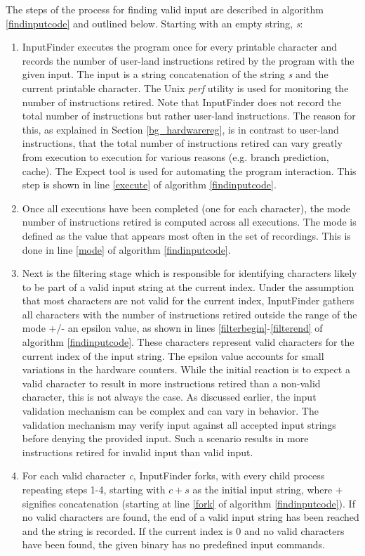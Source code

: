 \documentclass{sig-alternate-05-2015}
\def \tool {InputFinder}
\begin{document}
The steps of the process for finding valid input are described in algorithm \ref{findinputcode} and outlined below. Starting with an empty string, \textit{s}:
\begin{enumerate}
\item \tool{} executes the program once for every printable character and records the number of user-land instructions retired by the program with the given input. The input is a string concatenation of the string \textit{s} and the current printable character. The Unix \textit{perf} utility is used for monitoring the number of instructions retired. Note that \tool{} does not record the total number of instructions but rather user-land instructions. The reason for this, as explained in Section \ref{bg_hardwarereg}, is in contrast to user-land instructions, that the total number of instructions retired can vary greatly from execution to execution for various reasons (e.g. branch prediction, cache). The Expect tool is used for automating the program interaction. This step is shown in line \ref{execute} of algorithm \ref{findinputcode}.
\item Once all executions have been completed (one for each character), the mode number of instructions retired is computed across all executions. The mode is defined as the value that appears most often in the set of recordings. This is done in line \ref{mode} of algorithm \ref{findinputcode}.
\item Next is the filtering stage which is responsible for identifying characters likely to be part of a valid input string at the current index. Under the assumption that most characters are not valid for the current index, \tool{} gathers all characters with the number of instructions retired outside the range of the mode +/- an epsilon value, as shown in lines \ref{filterbegin}-\ref{filterend} of algorithm \ref{findinputcode}. These characters represent valid characters for the current index of the input string. The epsilon value accounts for small variations in the hardware counters. While the initial reaction is to expect a valid character to result in more instructions retired than a non-valid character, this is not always the case. As discussed earlier, the input validation mechanism can be complex and can vary in behavior. The validation mechanism may verify input against all accepted input strings before denying the provided input. Such a scenario results in more instructions retired for invalid input than valid input.
\item For each valid character \textit{c}, \tool{} forks, with every child process repeating steps 1-4, starting with $ c + s $ as the initial input string, where $+$ signifies concatenation (starting at line \ref{fork} of algorithm \ref{findinputcode}). If no valid characters are found, the end of a valid input string has been reached and the string is recorded. If the current index is 0 and no valid characters have been found, the given binary has no predefined input commands.
\end{enumerate}
\end{document}
